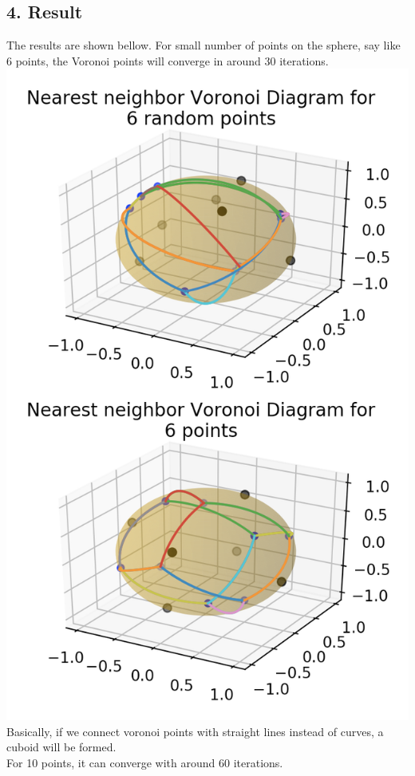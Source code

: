 \documentclass{article}
\begin{document}
\subsection*{4. Result}
The results are shown bellow. 
For small number of points on the sphere, say like 6 points,  the Voronoi points will converge in around 30 iterations. 
\\
\includegraphics[scale=0.4]{v6}
\\
Basically, if we connect voronoi points with straight lines instead of curves, a cuboid will be formed. 
\\
For 10 points, it can converge with around 60 iterations. 
\\
\end{document}
